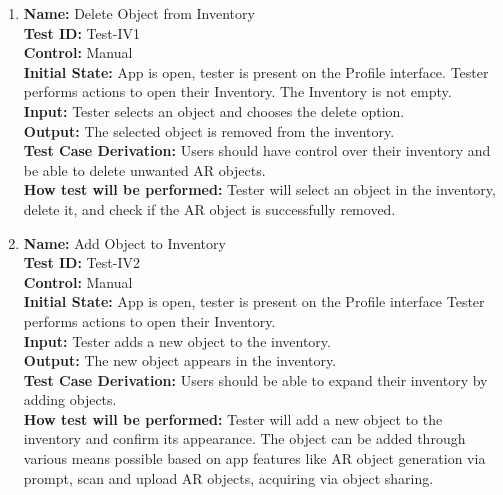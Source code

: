 \documentclass[12pt, titlepage]{article}
\begin{document}
\begin{enumerate}

  \item \textbf{Name:} Delete Object from Inventory \label{itm:Test-IV1} \\
        \textbf{Test ID:} Test-IV1 \\
        \textbf{Control:} Manual \\
        \textbf{Initial State:} App is open, tester is present on the Profile interface. Tester performs actions to open their Inventory. The Inventory is not empty. \\
        \textbf{Input:} Tester selects an object and chooses the delete option. \\
        \textbf{Output:} The selected object is removed from the inventory. \\
        \textbf{Test Case Derivation:} Users should have control over their inventory and be able to delete unwanted AR objects. \\
        \textbf{How test will be performed:} Tester will select an object in the inventory, delete it, and check if the AR object is successfully removed. \\

  \item \textbf{Name:} Add Object to Inventory \label{itm:Test-IV2} \\
        \textbf{Test ID:} Test-IV2 \\
        \textbf{Control:} Manual \\
        \textbf{Initial State:} App is open, tester is present on the Profile interface Tester performs actions to open their Inventory. \\
        \textbf{Input:} Tester adds a new object to the inventory. \\
        \textbf{Output:} The new object appears in the inventory. \\
        \textbf{Test Case Derivation:} Users should be able to expand their inventory by adding objects. \\
        \textbf{How test will be performed:} Tester will add a new object to the inventory and confirm its appearance. The object can be added through various means possible based on app features like AR object generation via prompt, scan and upload AR objects, acquiring via object sharing. \\


\end{enumerate}
\end{document}
